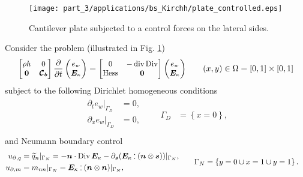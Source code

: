 \begin{figure}[t]
	\centering
	\texttt{[image: part\_3/applications/bs\_Kirchh/plate\_controlled.eps]}
	\caption{Cantilever plate subjected to a control forces on the lateral sides.}
	\label{fig:plate_controlled}
\end{figure}

Consider the problem (illustrated in Fig. \ref{fig:plate_controlled})
\begin{equation*}\small
\begin{bmatrix}
\rho h & 0 \\ 
\bm{0} & \bm{\mathcal{C}_b} \\
\end{bmatrix}
\diffp{}{t}
\begin{pmatrix}
e_w \\ \bm{E}_\kappa \\
\end{pmatrix} = 
\begin{bmatrix}
0 & -\div\Div \\ 
\Hess & \bm{0} \\
\end{bmatrix}
\begin{pmatrix}
e_w \\ \bm{E}_\kappa \\
\end{pmatrix} \qquad (x, y) \in \Omega = [0, 1]\times[0,1]
\end{equation*}
subject to the following Dirichlet homogeneous conditions
\begin{align*}
\begin{aligned}
\partial_t e_w|_{\Gamma_D} &= 0, \\
\partial_x e_w|_{\Gamma_D} &= 0, \\
\end{aligned} \qquad {\Gamma_D} &= \left\{x = 0 \right\},
\end{align*}
and Neumann boundary control
\begin{align*}
\begin{aligned}
u_{\partial, q} & = \widetilde{q}_n|_{\Gamma_N} = -\bm{n} \cdot \Div \bm{E}_\kappa - \partial_{\bm{s}} (\bm{E}_\kappa \cddot (\bm{n} \otimes \bm{s}))|_{\Gamma_N},\\
u_{\partial, m} &= m_{nn}|_{\Gamma_N} =\bm{E}_\kappa \cddot (\bm{n}\otimes \bm{n})|_{\Gamma_N}, \; \\
\end{aligned} \qquad {\Gamma_N} &= \left\{y = 0 \cup x=1 \cup y=1 \right\}.
\end{align*}
